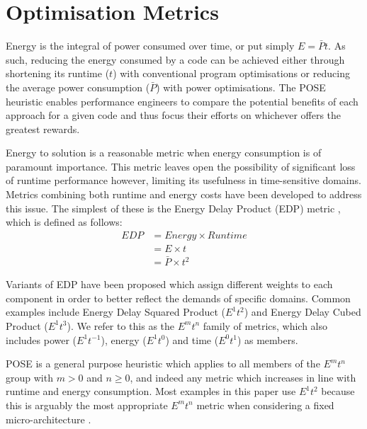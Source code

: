 \section{Optimisation Metrics}
\label{sec:metrics}
\noindent
Energy is the integral of power consumed over time, or put simply $E = \bar{P}t$.
As such, reducing the energy consumed by a code can be achieved either through shortening its runtime ($t$) with conventional program optimisations or reducing the average power consumption ($\bar{P}$) with power optimisations.
The POSE heuristic enables performance engineers to compare the potential benefits of each approach for a given code and thus focus their efforts on whichever offers the greatest rewards.

Energy to solution is a reasonable metric when energy consumption is of paramount importance.
This metric leaves open the possibility of significant loss of runtime performance however, limiting its usefulness in time-sensitive domains.
Metrics combining both runtime and energy costs have been developed to address this issue. 
The simplest of these is the Energy Delay Product (EDP) metric \cite{gonzales:1996aa}, which is defined as follows:
\begin{align}
  EDP &= Energy \times Runtime \nonumber \\
      &= E \times t \nonumber \\
      &= \bar{P} \times t^2
  \label{eq:edp}
\end{align}

Variants of EDP have been proposed which assign different weights to each component in order to better reflect the demands of specific domains.
Common examples include Energy Delay Squared Product ($E^1t^{2}$) and Energy Delay Cubed Product ($E^1t^{3}$).
We refer to this as the $E^mt^n$ family of metrics, which also includes power ($E^1t^{-1}$), energy ($E^1t^0$) and time ($E^0t^1$) as members.

POSE is a general purpose heuristic which applies to all members of the $E^mt^n$ group with $m > 0$ and $n \geq 0$, and indeed any metric which increases in line with runtime and energy consumption.
Most examples in this paper use $E^1t^2$ because this is arguably the most appropriate $E^mt^n$ metric when considering a fixed micro-architecture \cite{brooks:2000aa}.
